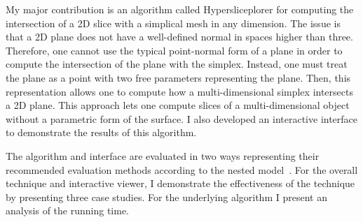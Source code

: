 My major contribution is an
algorithm called Hypersliceplorer for computing the intersection of a 2D slice with a simplical
mesh in any dimension. The issue is that a 2D plane does not have a
well-defined normal in spaces higher than three. Therefore, one cannot
use the typical point-normal form of a plane in order to compute the
intersection of the plane with the simplex. Instead, one must treat the plane
as a point with two free parameters representing the plane. Then, 
this representation allows one to compute how a
multi-dimensional simplex intersects a 2D plane. This approach lets one compute
slices of a multi-dimensional object without a parametric form of the
surface. I also developed an interactive interface to demonstrate the results 
of this algorithm.

The algorithm and interface are evaluated in two ways representing their recommended
evaluation methods according to the nested
model~\cite{Munzner:2009}. For the overall technique and
interactive viewer, I demonstrate the effectiveness of the technique by
presenting three case studies. For the underlying algorithm I present an
analysis of the running time. 

